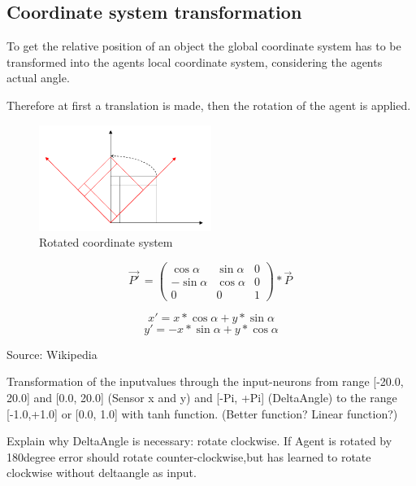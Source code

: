 \documentclass[10pt,a4paper,DIV=11]{scrreprt}
\begin{document}
\subsection{Coordinate system transformation}

To get the relative position of an object the global coordinate system has to be transformed into the agents local coordinate system, considering the agents actual angle.

Therefore at first a translation is made, then the rotation of the agent is applied.

\begin{center}
	\begin{figure}[H]
		\centering
		\includegraphics[width=0.5\textwidth,scale=1.0]{files/CoordinateRotation.png}  
		\caption{Rotated coordinate system \cite{wikkoor}}
		\label{fig:cosys-transform}
	\end{figure}
\end{center}

\begin{equation}
\vec{P'}^{\,} =
\begin{pmatrix}
\cos \alpha & \sin \alpha & 0 \\
-\sin \alpha & \cos \alpha & 0 \\
0 & 0 & 1
\end{pmatrix}
* \vec{P}^{\,}
\end{equation}

\begin{equation}
x' = x * \cos \alpha + y * \sin \alpha
\end{equation}
\begin{equation}
y' = -x * \sin \alpha + y * \cos \alpha
\end{equation}

Source: Wikipedia


Transformation of the inputvalues through the input-neurons from range [-20.0, 20.0] and [0.0, 20.0] (Sensor x and y) and [-Pi, +Pi] (DeltaAngle) to the range [-1.0,+1.0] or [0.0, 1.0] with tanh function. (Better function? Linear function?)

Explain why DeltaAngle is necessary:
rotate clockwise. If Agent is rotated by 180degree error should rotate counter-clockwise,but
has learned to rotate clockwise without deltaangle as input.
\end{document}
